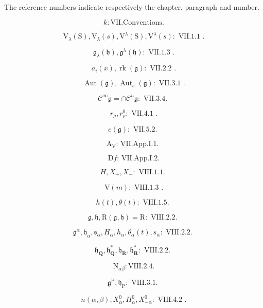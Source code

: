 
The reference numbers indicate respectively the chapter, paragraph and number.

\[
k \colon \mathrm{VII.Conventions}.
\]

\[
\mathrm{V} _ {\lambda} (\mathrm{S}), \mathrm{V} _ {\lambda} (s), \mathrm{V} ^ {\lambda} (\mathrm{S}), \mathrm{V} ^ {\lambda} (s) \colon \text { VII.1.1 }.
\]

\[
\mathfrak {g} _ {\lambda} (\mathfrak {h}), \mathfrak {g} ^ {\lambda} (\mathfrak {h}) \colon \text { VII.1.3 }.
\]

\[
a _ {i} (x), \operatorname{rk} (\mathfrak {g}): \text { VII.2.2 }.
\]

\[
\operatorname{Aut} (\mathfrak {g}), \operatorname{Aut} _ {e} (\mathfrak {g}): \text { VII.3.1 }.
\]

\[
\mathscr {C} ^ {\infty} \mathfrak {g} = \cap \mathscr {C} ^ {n} \mathfrak {g}: \text { VII.3.4. }
\]

\[
r _ {\rho}, r _ {\rho} ^ {0}: \text { VII.4.1 }.
\]

\[
e (\mathfrak {g}): \text {   VII.5.2.   }
\]

\[
\mathrm{A} _ {\mathrm{V}} \text {: VII.App.I.1. }
\]

\[
\mathrm{D} f \text {: VII.App.I.2.}
\]

\[
H, X _ {+}, X _ {-}: \text {   VIII.1.1.   }
\]

\[
\mathrm{V} (m): \text { VIII.1.3 }.
\]

\[
h (t), \theta (t): \text {   VIII.1.5.   }
\]

\[
\mathfrak {g}, \mathfrak {h}, \mathrm{R} (\mathfrak {g}, \mathfrak {h}) = \mathrm{R}: \text {   VIII.2.2.   }
\]

\[
\mathfrak {g} ^ {\alpha}, \mathfrak {h} _ {\alpha}, \mathfrak {s} _ {\alpha}, H _ {\alpha}, h _ {\alpha}, \theta_ {\alpha} (t), s _ {\alpha}: \text {   VIII.2.2.   }
\]

\[
\mathfrak {h} _ {\mathbf {Q}}, \mathfrak {h} _ {\mathbf {Q}} ^ {*}, \mathfrak {h} _ {\mathbf {R}}, \mathfrak {h} _ {\mathbf {R}} ^ {*}: \text {   VIII.2.2.   }
\]

\[
\mathrm{N} _ {\alpha \beta}: \mathrm{VIII.2.4}.
\]

\[
\mathfrak {g} ^ {\mathrm{P}}, \mathfrak {h} _ {\mathrm{P}}: \text {   VIII.3.1.   }
\]

\[
n (\alpha , \beta), X _ {\alpha} ^ {0}, H _ {\alpha} ^ {0}, X _ {- \alpha} ^ {0}: \text { VIII.4.2 }.
\]

